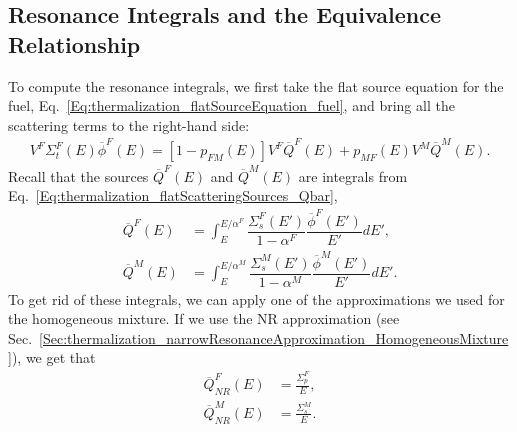 \subsection{Resonance Integrals and the Equivalence Relationship}

To compute the resonance integrals, we first take the flat source equation for the fuel, Eq.~\eqref{Eq:thermalization_flatSourceEquation_fuel}, and bring all the scattering terms to the right-hand side:
\begin{align}
   V^F \Sigma_t^F(E) \overline{\phi}^F(E) = [ 1 - p_{FM}(E) ] V^F \overline{Q}^F(E) + p_{MF}(E) V^M \overline{Q}^M(E) .
\end{align}
Recall that the sources $\overline{Q}^F(E)$ and $\overline{Q}^M(E)$ are integrals from Eq.~\eqref{Eq:thermalization_flatScatteringSources_Qbar},
\begin{align}
  \overline{Q}^F(E) &= \displaystyle\int_E^{E/\alpha^F} \dfrac{ \Sigma_s^F(E') }{ 1 - \alpha^F } \dfrac{ \overline{\phi}^F(E') }{ E' } dE', \nonumber \\ 
  \overline{Q}^M(E) &= \displaystyle\int_E^{E/\alpha^M} \dfrac{ \Sigma_s^M(E') }{ 1 - \alpha^M } \dfrac{ \overline{\phi}^M(E') }{ E' } dE'. \nonumber
\end{align}
To get rid of these integrals, we can apply one of the approximations we used for the homogeneous mixture. If we use the NR approximation (see Sec.~\ref{Sec:thermalization_narrowResonanceApproximation_HomogeneousMixture}), we get that
\begin{subequations}
\begin{align}
  \overline{Q}_{NR}^F(E) &= \frac{\Sigma_p^F}{E}, \\
  \overline{Q}_{NR}^M(E) &= \frac{\Sigma_s^M}{E}.
\end{align}
\end{subequations}

